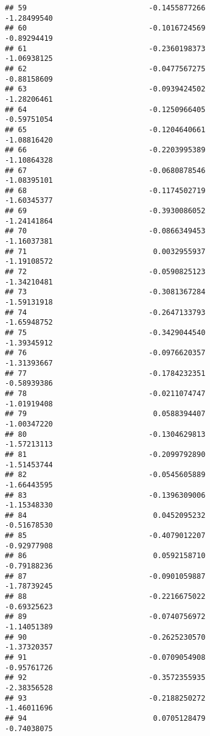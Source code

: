 \documentclass[
]{article}
\begin{document}
\begin{verbatim}
## 59                            -0.1455877266                -1.28499540
## 60                            -0.1016724569                -0.89294419
## 61                            -0.2360198373                -1.06938125
## 62                            -0.0477567275                -0.88158609
## 63                            -0.0939424502                -1.28206461
## 64                            -0.1250966405                -0.59751054
## 65                            -0.1204640661                -1.08816420
## 66                            -0.2203995389                -1.10864328
## 67                            -0.0680878546                -1.08395101
## 68                            -0.1174502719                -1.60345377
## 69                            -0.3930086052                -1.24141864
## 70                            -0.0866349453                -1.16037381
## 71                             0.0032955937                -1.19108572
## 72                            -0.0590825123                -1.34210481
## 73                            -0.3081367284                -1.59131918
## 74                            -0.2647133793                -1.65948752
## 75                            -0.3429044540                -1.39345912
## 76                            -0.0976620357                -1.31393667
## 77                            -0.1784232351                -0.58939386
## 78                            -0.0211074747                -1.01919408
## 79                             0.0588394407                -1.00347220
## 80                            -0.1304629813                -1.57213113
## 81                            -0.2099792890                -1.51453744
## 82                            -0.0545605889                -1.66443595
## 83                            -0.1396309006                -1.15348330
## 84                             0.0452095232                -0.51678530
## 85                            -0.4079012207                -0.92977908
## 86                             0.0592158710                -0.79188236
## 87                            -0.0901059887                -1.78739245
## 88                            -0.2216675022                -0.69325623
## 89                            -0.0740756972                -1.14051389
## 90                            -0.2625230570                -1.37320357
## 91                            -0.0709054908                -0.95761726
## 92                            -0.3572355935                -2.38356528
## 93                            -0.2188250272                -1.46011696
## 94                             0.0705128479                -0.74038075

\end{verbatim}
\end{document}
